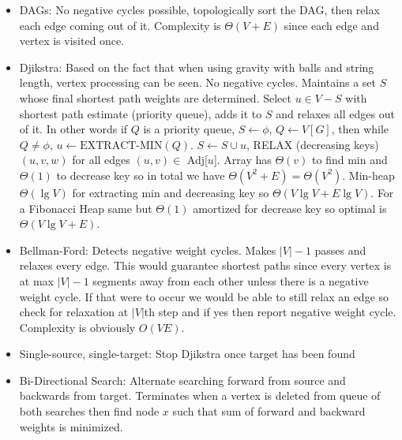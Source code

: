 \documentclass{article}
\begin{document}
\vspace{-1mm}
\begin{itemize}
\item DAGs: No negative cycles possible, topologically sort the DAG, then relax each edge coming out of it. Complexity is $\Theta(V+E)$ since each edge and vertex is visited once.
\item Djikstra: Based on the fact that when using gravity with balls and string length, vertex processing can be seen. No negative cycles. Maintains a set $S$ whose final shortest path weights are determined. Select $u\in V-S$ with shortest path estimate (priority queue), adds it to $S$ and relaxes all edges out of it. In other words if $Q$ is a priority queue, $S\leftarrow \phi$, $Q\leftarrow V[G]$, then while $Q\neq \phi$, $u\leftarrow \text{EXTRACT-MIN} (Q)$. $S\leftarrow S\cup u$, RELAX (decreasing keys) $(u,v,w)$ for all edges $(u,v)\in$ Adj[$u$]. Array has $\Theta(v)$ to find min and $\Theta(1)$ to decrease key so in total we have $\Theta(V^2+E)=\Theta(V^2)$. Min-heap $\Theta(\lg V)$ for extracting min and decreasing key so $\Theta(V\lg V + E\lg V)$. For a Fibonacci Heap same but $\Theta(1)$ amortized for decrease key so optimal is $\Theta(V\lg V + E)$.
\item Bellman-Ford: Detects negative weight cycles. Makes $|V|-1$ passes and relaxes every edge. This would guarantee shortest paths since every vertex is at max $|V|-1$ segments away from each other unless there is a negative weight cycle. If that were to occur we would be able to still relax an edge so check for relaxation at $|V|$th step and if yes then report negative weight cycle. Complexity is obviously $O(VE)$.
\item Single-source, single-target: Stop Djikstra once target has been found
\item Bi-Directional Search: Alternate searching forward from source and backwards from target. Terminates when a vertex is deleted from queue of both searches then find node $x$ such that sum of forward and backward weights is minimized.
\end{itemize}
\end{document}
